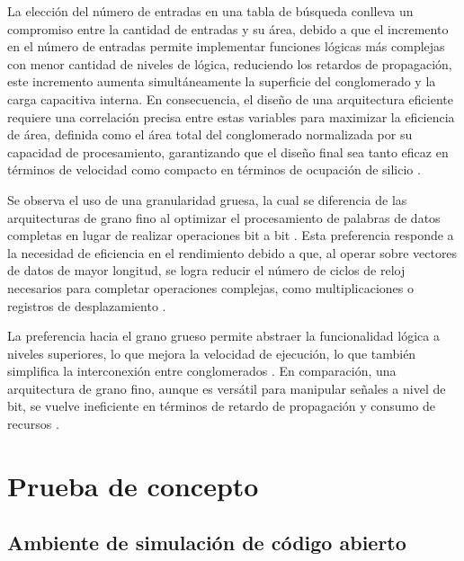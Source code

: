 La elección del número de entradas en una tabla de búsqueda conlleva un compromiso entre la cantidad de entradas y su área, debido a que el incremento en el número de entradas permite implementar funciones lógicas más complejas con menor cantidad de niveles de lógica, reduciendo los retardos de propagación, este incremento aumenta simultáneamente la superficie del conglomerado y la carga capacitiva interna. En consecuencia, el diseño de una arquitectura eficiente requiere una correlación precisa entre estas variables para maximizar la eficiencia de área, definida como el área total del conglomerado normalizada por su capacidad de procesamiento, garantizando que el diseño final sea tanto eficaz en términos de velocidad como compacto en términos de ocupación de silicio \cite{saidi2020survey, abderrahmaneMaximizeFlexibility}.

Se observa el uso de una granularidad gruesa, la cual se diferencia de las arquitecturas de grano fino al optimizar el procesamiento de palabras de datos completas en lugar de realizar operaciones bit a bit \cite{saidi2020survey, abderrahmaneMaximizeFlexibility}. Esta preferencia responde a la necesidad de eficiencia en el rendimiento debido a que, al operar sobre vectores de datos de mayor longitud, se logra reducir el número de ciclos de reloj necesarios para completar operaciones complejas, como multiplicaciones o registros de desplazamiento \cite{saidi2020survey, abderrahmaneMaximizeFlexibility}.

La preferencia hacia el grano grueso permite abstraer la funcionalidad lógica a niveles superiores, lo que mejora la velocidad de ejecución, lo que también simplifica la interconexión entre conglomerados \cite{saidi2020survey, abderrahmaneMaximizeFlexibility}. En comparación, una arquitectura de grano fino, aunque es versátil para manipular señales a nivel de bit, se vuelve ineficiente en términos de retardo de propagación y consumo de recursos \cite{saidi2020survey, abderrahmaneMaximizeFlexibility}.


\chapter{Prueba de concepto}
\label{ch:diseño}

\section{Ambiente de simulación de código abierto}

